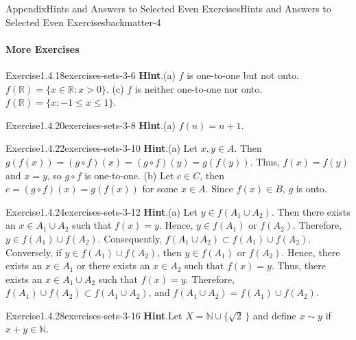 \documentclass[oneside,10pt,]{book}
\newcommand{\blocktitlefont}{\relax}
\numberwithin{equation}{section}
\newcommand{\gt}{>}
\begin{document}
\begin{solutions-chapter}{Appendix}{Hints and Answers to Selected Even Exercises}{}{Hints and Answers to Selected Even Exercises}{}{}{backmatter-4}
\paragraph[{More Exercises}]{More Exercises}
\begin{divisionsolution}{Exercise}{1.4.18}{}{exercises-sets-3-6}%
\noindent\textbf{\blocktitlefont Hint}.\hypertarget{exercises-sets-3-6-2-back}{}\quad{}(a) \(f\) is one-to-one but not onto. \(f({\mathbb R} ) = \{ x \in {\mathbb R} : x \gt 0 \}\).  (c) \(f\) is neither one-to-one nor onto.  \(f(\mathbb R) = \{ x : -1 \leq x \leq 1 \}\).%
\end{divisionsolution}%
\begin{divisionsolution}{Exercise}{1.4.20}{}{exercises-sets-3-8}%
\noindent\textbf{\blocktitlefont Hint}.\hypertarget{exercises-sets-3-8-2-back}{}\quad{}(a) \(f(n) = n + 1\).%
\end{divisionsolution}%
\begin{divisionsolution}{Exercise}{1.4.22}{}{exercises-sets-3-10}%
\noindent\textbf{\blocktitlefont Hint}.\hypertarget{exercises-sets-3-10-2-back}{}\quad{}(a) Let \(x, y \in A\). Then \(g(f(x)) = (g \circ f)(x) = (g \circ f)(y) = g(f(y))\).  Thus, \(f(x) = f(y)\) and \(x = y\),  so \(g \circ f\) is one-to-one. (b) Let \(c \in C\), then \(c = (g \circ f)(x) = g(f(x))\) for some \(x \in A\). Since \(f(x) \in B\), \(g\) is onto.%
\end{divisionsolution}%
\begin{divisionsolution}{Exercise}{1.4.24}{}{exercises-sets-3-12}%
\noindent\textbf{\blocktitlefont Hint}.\hypertarget{exercises-sets-3-12-2-back}{}\quad{}(a) Let \(y \in f(A_1 \cup A_2)\).  Then there exists an \(x \in A_1 \cup A_2\) such that \(f(x) = y\).  Hence, \(y \in f(A_1)\) or \(f(A_2) \).  Therefore, \(y \in f(A_1) \cup f(A_2)\). Consequently, \(f(A_1 \cup A_2) \subset f(A_1) \cup f(A_2)\). Conversely, if \(y \in f(A_1) \cup f(A_2)\), then \(y \in f(A_1)\) or \(f(A_2)\).  Hence, there exists an \(x \in A_1\) or there exists an \(x \in A_2\) such that \(f(x) = y\).  Thus, there exists an \(x \in A_1 \cup A_2\) such that \(f(x) = y\).  Therefore, \(f(A_1) \cup f(A_2) \subset f(A_1 \cup A_2)\), and \(f(A_1 \cup A_2) = f(A_1) \cup f(A_2)\).%
\end{divisionsolution}%
\begin{divisionsolution}{Exercise}{1.4.28}{}{exercises-sets-3-16}%
\noindent\textbf{\blocktitlefont Hint}.\hypertarget{exercises-sets-3-16-2-back}{}\quad{}Let \(X = {\mathbb N} \cup \{ \sqrt{2}\, \}\) and define \(x \sim y\) if \(x + y \in {\mathbb N}\).%

\end{divisionsolution}
\end{solutions-chapter}
\end{document}

